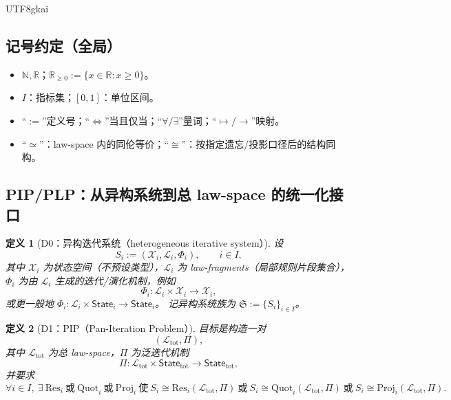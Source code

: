 \documentclass[12pt]{article}
\newtheorem{definition}{定义}[section]
\begin{document}
\begin{CJK*}{UTF8}{gkai}
\subsection{记号约定（全局）}
\label{subsec:tex19-appB-notation}

\begin{itemize}
  \item $\mathbb{N},\mathbb{R}$；$\mathbb{R}_{\ge 0}:=\{x\in\mathbb{R}:x\ge 0\}$。
  \item $I$：指标集；$[0,1]$：单位区间。
  \item “$:=$”定义号；“$\Longleftrightarrow$”当且仅当；“$\forall/\exists$”量词；“$\mapsto/\to$”映射。
  \item “$\simeq$”：law-space 内的同伦等价；“$\cong$”：按指定遗忘/投影口径后的结构同构。
\end{itemize}

\subsection{PIP/PLP：从异构系统到总 law-space 的统一化接口}
\label{subsec:tex19-appB-pip-plp}

\begin{definition}[D0：异构迭代系统（heterogeneous iterative system）]
\label{def:tex19-appB-D0-system}
设
\[
S_i:=(\mathcal{X}_i,\mathcal{L}_i,\Phi_i),\qquad i\in I,
\]
其中 $\mathcal{X}_i$ 为状态空间（不预设类型），$\mathcal{L}_i$ 为 law-fragments（局部规则片段集合），$\Phi_i$ 为由 $\mathcal{L}_i$ 生成的迭代/演化机制，例如
\[
\Phi_i:\mathcal{L}_i\times \mathcal{X}_i\to \mathcal{X}_i,
\]
或更一般地 $\Phi_i:\mathcal{L}_i\times \mathsf{State}_i\to \mathsf{State}_i$。
记异构系统族为 $\mathfrak{S}:=\{S_i\}_{i\in I}$。
\end{definition}

\begin{definition}[D1：PIP（Pan-Iteration Problem）]
\label{def:tex19-appB-D1-pip}
目标是构造一对
\[
(\mathcal{L}_{\mathrm{tot}},\Pi),
\]
其中 $\mathcal{L}_{\mathrm{tot}}$ 为总 law-space，$\Pi$ 为泛迭代机制
\[
\Pi:\mathcal{L}_{\mathrm{tot}}\times \mathsf{State}_{\mathrm{tot}}\to \mathsf{State}_{\mathrm{tot}},
\]
并要求
\[
\forall i\in I,\ \exists\ \mathrm{Res}_i\ \text{或}\ \mathrm{Quot}_i\ \text{或}\ \mathrm{Proj}_i
\ \text{使}\
S_i\cong \mathrm{Res}_i(\mathcal{L}_{\mathrm{tot}},\Pi)\ \text{或}\
S_i\cong \mathrm{Quot}_i(\mathcal{L}_{\mathrm{tot}},\Pi)\ \text{或}\
S_i\cong \mathrm{Proj}_i(\mathcal{L}_{\mathrm{tot}},\Pi).
\]
\end{definition}


\end{CJK*}
\end{document}
